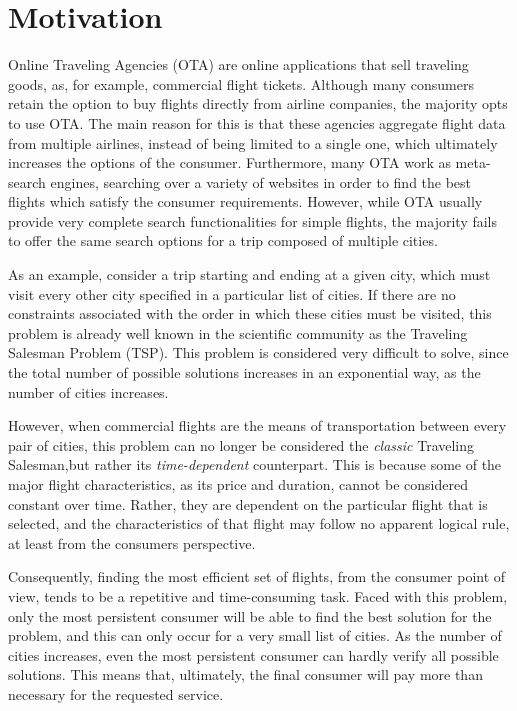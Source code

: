 \section{Motivation}

Online Traveling Agencies (OTA) are online applications that sell traveling goods, as, for example, commercial flight tickets. Although many consumers retain the option to buy flights directly from airline companies, the majority opts to use OTA. The main reason for this is that these agencies aggregate flight data from multiple airlines, instead of being limited to a single one, which ultimately increases the options of the consumer. Furthermore, many OTA work as meta-search engines, searching over a variety of websites in order to find the best flights which satisfy the consumer requirements. However, while OTA usually provide very complete search functionalities for simple flights, the majority fails to offer the same search options for a trip composed of multiple cities. 

As an example, consider a trip starting and ending at a given city, which must visit every other city specified in a particular list of cities. If there are no constraints associated with the order in which these cities must be visited, this problem is already well known in the scientific community as the Traveling Salesman Problem (TSP). This problem is considered very difficult to solve, since the total number  of possible solutions increases in an exponential way, as the number of cities increases.

However, when commercial flights are the means of transportation between every pair of cities, this problem can no longer be considered the \textit{classic} Traveling Salesman,but rather its \textit{time-dependent} counterpart. This is because some of the major flight characteristics, as its price and duration, cannot be considered constant over time. Rather, they are dependent on the particular flight that is selected, and the characteristics of that flight may follow no apparent logical rule, at least from the consumers perspective.

Consequently, finding the most efficient set of flights, from the consumer point of view, tends to be a repetitive and time-consuming task. Faced with this problem, only the most persistent consumer will be able to find the best solution for the problem, and this can only  occur for a very small list of cities. As the number of cities increases, even the most persistent consumer can hardly verify all possible solutions. This means that, ultimately, the final consumer will pay more than necessary for the requested service.

